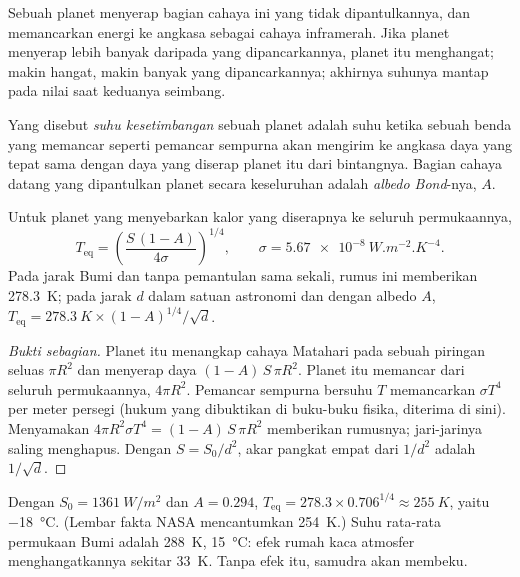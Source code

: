 Sebuah planet menyerap bagian cahaya ini yang tidak dipantulkannya, dan
memancarkan energi ke angkasa sebagai cahaya inframerah. Jika planet menyerap
lebih banyak daripada yang dipancarkannya, planet itu menghangat; makin hangat,
makin banyak yang dipancarkannya; akhirnya suhunya mantap pada nilai saat
keduanya seimbang.

\begin{definition}\label{def:g10:habitable-planet:equilibrium-temperature}
Yang disebut \emph{suhu kesetimbangan} sebuah
planet adalah suhu ketika sebuah benda yang memancar seperti pemancar sempurna
akan mengirim ke angkasa daya yang tepat sama dengan daya yang diserap planet
itu dari bintangnya. Bagian cahaya datang yang dipantulkan planet secara
keseluruhan adalah \emph{albedo Bond}-nya, $A$.
\end{definition}

\begin{proposition}\label{prop:g10:habitable-planet:teq}
Untuk planet yang menyebarkan kalor yang diserapnya ke seluruh permukaannya,
\[
  T_{\mathrm{eq}} = \left(\frac{S\,(1-A)}{4\sigma}\right)^{1/4},
  \qquad \sigma = \qty{5.67e-8}{W.m^{-2}.K^{-4}}.
\]
Pada jarak Bumi dan tanpa pemantulan sama sekali, rumus ini memberikan
\qty{278.3}{K}; pada jarak $d$ dalam satuan astronomi dan dengan albedo $A$,
$T_{\mathrm{eq}} = \qty{278.3}{K} \times (1-A)^{1/4}/\sqrt{d}$.
\end{proposition}

\begin{proof}[Bukti sebagian]
Planet itu menangkap cahaya Matahari pada sebuah piringan seluas $\pi R^2$
dan menyerap daya $(1-A)\,S\,\pi R^2$. Planet itu memancar dari seluruh
permukaannya, $4\pi R^2$. Pemancar sempurna bersuhu $T$ memancarkan
$\sigma T^4$ per meter persegi (hukum yang dibuktikan di buku-buku fisika,
diterima di sini). Menyamakan $4\pi R^2 \sigma T^4 = (1-A)\,S\,\pi R^2$
memberikan rumusnya; jari-jarinya saling menghapus. Dengan $S = S_0/d^2$,
akar pangkat empat dari $1/d^2$ adalah $1/\sqrt d$.
\end{proof}

\begin{example}[Bumi]\label{ex:g10:habitable-planet:earth}
Dengan $S_0 = \qty{1361}{W/m^2}$ dan $A = 0.294$,
$T_{\mathrm{eq}} = 278.3 \times 0.706^{1/4} \approx \qty{255}{K}$, yaitu
\qty{-18}{\degreeCelsius}. (Lembar fakta NASA mencantumkan \qty{254}{K}.) Suhu
rata-rata permukaan Bumi adalah \qty{288}{K}, \qty{15}{\degreeCelsius}: efek
rumah kaca atmosfer menghangatkannya sekitar \qty{33}{K}. Tanpa efek itu,
samudra akan membeku.
\end{example}

